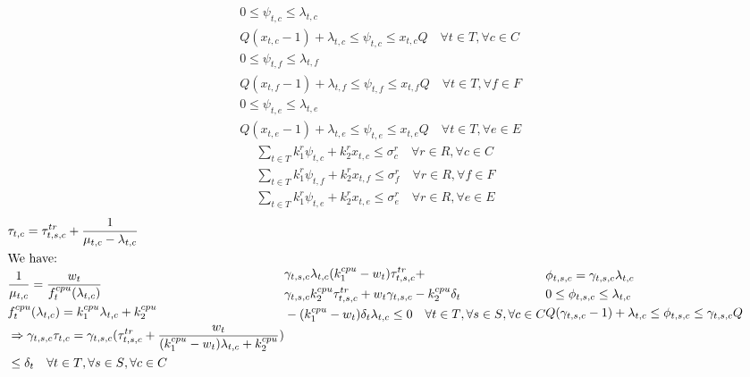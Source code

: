\documentclass[conference]{IEEEtran}
\begin{document}
    \begin{subequations}
      \begin{align}
      &0 \leq \psi_{t,c} \leq \lambda_{t,c} \\
      &Q(x_{t,c}-1)+\lambda_{t,c} \leq \psi_{t,c} \leq x_{t,c}Q \quad \forall{t\in T}, \forall{c \in C} \\
      &0 \leq \psi_{t,f} \leq \lambda_{t,f} \\
      &Q(x_{t,f}-1)+\lambda_{t,f} \leq \psi_{t,f} \leq x_{t,f}Q \quad \forall{t \in T}, \forall{f \in F} \\
      &0 \leq \psi_{t,e} \leq \lambda_{t,e} \\
      &Q(x_{t,e}-1)+\lambda_{t,e} \leq \psi_{t,e} \leq x_{t,e}Q \quad \forall{t \in T}, \forall{e \in E}
      \end{align}
    \end{subequations}
    \begin{subequations}
      \begin{align}
        \sum_{t \in T}k_1^r\psi_{t,c}+k_2^rx_{t,c} \le \sigma_c^r \quad \forall{r \in R}, \forall{c \in C} \\
        \sum_{t \in T}k_1^r\psi_{t,f}+k_2^rx_{t,f} \le \sigma_f^r \quad \forall{r \in R}, \forall{f \in F} \\
        \sum_{t \in T}k_1^r\psi_{t,e}+k_2^rx_{t,e} \le \sigma_e^r \quad \forall{r \in R}, \forall{e \in E}
      \end{align}
    \end{subequations}
    \begin{subequations}
      \begin{align}
        &\tau_{t,c} = \tau_{t,s,c}^{tr} + \frac{1}{\mu_{t,c}-\lambda_{t,c}} \\
        &\notag\text{We have:} \\
        &\frac{1}{\mu_{t,c}} = \frac{w_t}{f_t^{cpu}(\lambda_{t,c})} \\
        &f_t^{cpu}(\lambda_{t,c}) = k_1^{cpu}\lambda_{t,c}+k_2^{cpu} \\
        &\notag\Rightarrow \gamma_{t,s,c} \tau_{t,c} = \gamma_{t,s,c} (\tau_{t,s,c}^{tr} + \frac{w_t}{(k_1^{cpu}-w_t)\lambda_{t,c} + k_2^{cpu}}) \\
        &\le \delta_t \quad \forall{t \in T}, \forall{s \in S}, \forall{c \in C}
      \end{align}
      \begin{align}
        &\notag\gamma_{t,s,c}\lambda_{t,c}(k_1^{cpu}-w_t)\tau^{tr}_{t,s,c} + \\ &\notag\gamma_{t,s,c}k_2^{cpu}\tau_{t,s,c}^{tr}+w_t\gamma_{t,s,c}-k_2^{cpu}\delta_t \\ &-(k_1^{cpu}-w_t)\delta_t\lambda_{t,c} \le 0 \quad \forall{t \in T}, \forall{s \in S}, \forall{c \in C}
      \end{align}
      \begin{align}
        &\phi_{t,s,c} = \gamma_{t,s,c}\lambda_{t,c} \\
        &0 \le \phi_{t,s,c} \le \lambda_{t,c} \\
        &Q(\gamma_{t,s,c}-1)+\lambda_{t,c} \le \phi_{t,s,c} \le \gamma_{t,s,c}Q
      \end{align}
    \end{subequations}
\end{document}
